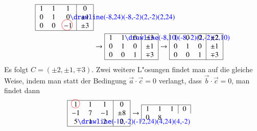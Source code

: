 \begin{beispiel}
\begin{align*}
\begin{tabular}{|>{$}c<{$}>{$}c<{$}>{$}c<{$}|>{$}c<{$}|}
\hline
1&1&1&0\\
0&1&0%
\begin{picture}(0,0)%
\color{blue}\drawline(-8,24)(-8,-2)(2,-2)(2,24)
\end{picture}%
&\pm1\\
0&0&-1%
\begin{picture}(0,0)
\color{red}\put(-7,4){\circle{15}}
\end{picture}%
&\pm3\\
\hline
\end{tabular}
\\
&
\rightarrow
\begin{tabular}{|>{$}c<{$}>{$}c<{$}>{$}c<{$}|>{$}c<{$}|}
\hline
1&1%
\begin{picture}(0,0)%
\color{blue}\drawline(-8,10)(-8,-2)(2,-2)(2,10)
\end{picture}%
&0&\pm3\\
0&1&0&\pm1\\
0&0&1&\mp3\\
\hline
\end{tabular}
\rightarrow
\begin{tabular}{|>{$}c<{$}>{$}c<{$}>{$}c<{$}|>{$}c<{$}|}
\hline
1&0&0&\pm 2\\
0&1&0&\pm1\\
0&0&1&\mp3\\
\hline
\end{tabular}
\end{align*}
Es folgt $C=(\pm 2,\pm1,\mp3)$. Zwei weitere L"osungen findet
man auf die gleiche Weise, indem man statt der Bedingung $\vec a\cdot\vec c=0$
verlangt, dass $\vec b\cdot\vec c=0$, man findet dann
\begin{align*}
\begin{tabular}{|>{$}c<{$}>{$}c<{$}>{$}c<{$}|>{$}c<{$}|}
\hline
1%
\begin{picture}(0,0)
\color{red}\put(-3,4){\circle{12}}
\end{picture}%
&1&1&0\\
-1&7&-1&\pm8\\
5%
\begin{picture}(0,0)%
\color{blue}\drawline(-12,-2)(-12,24)(4,24)(4,-2)
\end{picture}%
&1&2&0\\
\hline
\end{tabular}
&
\rightarrow
\begin{tabular}{|>{$}c<{$}>{$}c<{$}>{$}c<{$}|>{$}c<{$}|}
\hline
1&1&1&0\\
0&8%
\begin{picture}(0,0)

\end{picture}
\end{tabular}
\end{align*}
\end{beispiel}
